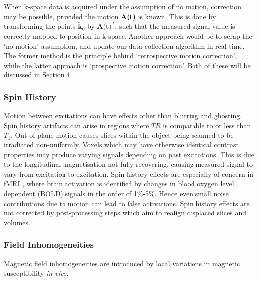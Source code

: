 \documentclass[class=article, crop=false]{standalone}
\begin{document}
\par
When k-space data is acquired under the assumption of no motion, correction may be possible, provided the motion \textbf{A(t)} is known. This is done by transforming the points $\tilde{\textbf{k}}_0$ by $\textbf{A(t)}^T$, such that the measured signal value is correctly mapped to position in k-space. Another approach would be to scrap the `no motion' assumption, and update our data collection algorithm in real time. The former method is the principle behind `retrospective motion correction', while the latter approach is `prospective motion correction'. Both of these will be discussed in Section 4.

\subsubsection*{Spin History}
Motion between excitations can have effects other than blurring and ghosting. Spin history artifacts can arise in regions where $TR$ is comparable to or less than $T_1$. Out of plane motion causes slices within the object being scanned to be irradiated non-uniformly. Voxels which may have otherwise identical contrast properties may produce varying signals depending on past excitations. This is due to the longitudinal magnetisation not fully recovering, causing measured signal to vary from excitation to excitation. Spin history effects are especially of concern in fMRI \parencite{Friston1996,Muresan2005}, where brain activation is identified by changes in blood oxygen level dependent (BOLD) signals in the order of 1\%-5\%. Hence even small noise contributions due to motion can lead to false activations. Spin history effects are not corrected by post-processing steps which aim to realign displaced slices and volumes.

\subsubsection*{Field Inhomogeneities}
Magnetic field inhomogeneities are introduced by local variations in magnetic susceptibility \textit{in vivo}.
\end{document}
